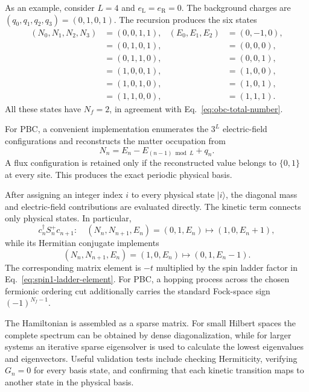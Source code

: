 As an example, consider $L=4$ and
$e_{\mathrm L}=e_{\mathrm R}=0$.  The background charges are
$(q_0,q_1,q_2,q_3)=(0,1,0,1)$.  The recursion produces the six states
\begin{align}
 (N_0,N_1,N_2,N_3) &=(0,0,1,1), & (E_0,E_1,E_2)&=(0,-1,0),\\
                    &=(0,1,0,1), &                    &=(0,0,0),\\
                    &=(0,1,1,0), &                    &=(0,0,1),\\
                    &=(1,0,0,1), &                    &=(1,0,0),\\
                    &=(1,0,1,0), &                    &=(1,0,1),\\
                    &=(1,1,0,0), &                    &=(1,1,1).
\end{align}
All these states have $N_f=2$, in agreement with
Eq.~\eqref{eq:obc-total-number}.

For PBC, a convenient implementation enumerates the $3^L$ electric-field
configurations and reconstructs the matter occupation from
\begin{equation}
\label{eq:pbc-matter-from-flux}
    N_n=E_n-E_{(n-1)\bmod L}+q_n.
\end{equation}
A flux configuration is retained only if the reconstructed value belongs to
$\{0,1\}$ at every site.  This produces the exact periodic physical basis.

After assigning an integer index $i$ to every physical state $|i\rangle$, the
diagonal mass and electric-field contributions are evaluated directly.  The
kinetic term connects only physical states.  In particular,
\begin{equation}
    c_n^\dagger S_n^+c_{n+1}:
    \quad (N_n,N_{n+1},E_n)
    =(0,1,E_n)\longmapsto(1,0,E_n+1),
\end{equation}
while its Hermitian conjugate implements
\begin{equation}
    (N_n,N_{n+1},E_n)
    =(1,0,E_n)\longmapsto(0,1,E_n-1).
\end{equation}
The corresponding matrix element is $-t$ multiplied by the spin ladder
factor in Eq.~\eqref{eq:spin1-ladder-element}.  For PBC, a hopping process
across the chosen fermionic ordering cut additionally carries the standard
Fock-space sign $(-1)^{N_f-1}$.

The Hamiltonian is assembled as a sparse matrix.  For small Hilbert spaces the
complete spectrum can be obtained by dense diagonalization, while for larger
systems an iterative sparse eigensolver is used to calculate the lowest
eigenvalues and eigenvectors.  Useful validation tests include checking
Hermiticity, verifying $G_n=0$ for every basis state, and confirming that each
kinetic transition maps to another state in the physical basis.

